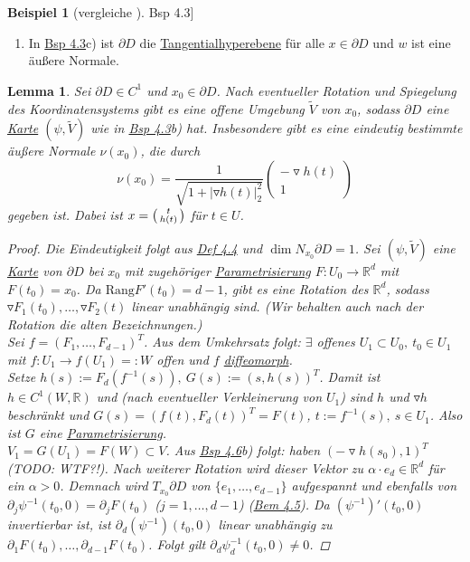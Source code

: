 \documentclass[a4paper]{report}
\newcommand{\R}{\mathbb{R}}
\newenvironment{jsmallmatrix}{\left( \begin{smallmatrix}}{\end{smallmatrix} \right)}
\newcommand{\jlabel}[1]{\label{j_#1}}
\newcommand{\jhyperref}[2]{\hyperref[j_#1]{#2}}
\newcommand{\jlink}[1]{\jhyperref{#1}{#1}}
\newcommand{\jabb}[3]{ #1: #2 \rightarrow #3 }
\theoremstyle{plain}
\newtheorem{lem}[thm]{Lemma}
\theoremstyle{definition}
\newtheorem{expl}[thm]{Beispiel}
\begin{document}
{{{{\begin{expl}[vergleiche \jlink{Bsp 4.3}]
\begin{enumerate}
        \item In \jlink{Bsp 4.3}c) ist $\partial D$ die \jlink{Tangentialhyperebene} für alle $x\in\partial D$ und $w$ ist eine äußere Normale.
    \end{enumerate}
\end{expl}

\begin{lem}
    \jlabel{Lem 4.7}
    Sei $\partial D \in C^1$ und $x_0\in \partial D$. Nach eventueller Rotation und Spiegelung des Koordinatensystems gibt es eine offene Umgebung $\tilde{V}$ von $x_0$, sodass $\partial D$ eine \jlink{Karte} $(\psi, \tilde{V})$ wie in \jlink{Bsp 4.3}b) hat. Insbesondere gibt es eine eindeutig bestimmte äußere Normale $\nu(x_0)$, die durch
    \[
        \nu(x_0) = \frac{1}{\sqrt{1 + |\triangledown h(t)|_2^2}} \begin{pmatrix}
                                                                     -\triangledown h(t) \\
                                                                     1
                                                                 \end{pmatrix}
    \]
    gegeben ist. Dabei ist $x = \begin{jsmallmatrix} t \\ h(t) \end{jsmallmatrix}$ für $t\in U$.
    \begin{proof}
        Die Eindeutigkeit folgt aus \jlink{Def 4.4} und $\dim N_{x_0} \partial D = 1$. Sei $(\psi, \tilde{V})$ eine \jlink{Karte} von $\partial D$ bei $x_0$ mit zugehöriger \jlink{Parametrisierung} $\jabb{F}{U_0}{\R^d}$ mit $F(t_0) = x_0$. Da $\text{Rang} F'(t_0) = d-1$, gibt es eine Rotation des $\R^d$, sodass $\triangledown F_1(t_0),\dots, \triangledown F_2(t)$ linear unabhängig sind. (Wir behalten auch nach der Rotation die alten Bezeichnungen.)\\
        Sei $f = (F_1,\dots, F_{d-1})^T$. Aus dem Umkehrsatz folgt: $\exists$ offenes $U_1\subset U_0,\ t_0 \in U_1$ mit $\jabb{f}{U_1}{f(U_1)} =: W$ offen und $f$ \jlink{diffeomorph}.\\
        Setze $h(s) := F_d(f^{-1}(s)), \ G(s) := (s, h(s))^T$. Damit ist $h\in C^1(W,\R)$ und (nach eventueller Verkleinerung von $U_1$) sind $h$ und $\triangledown h$ beschränkt und $G(s) = (f(t), F_d(t))^T = F(t)$, $t := f^{-1}(s), \ s\in U_1$. Also ist $G$ eine \jlink{Parametrisierung}.\\
        $V_1 = G(U_1) = F(W) \subset V$. Aus \jlink{Bsp 4.6}b) folgt: haben $(-\triangledown h(s_0), 1)^T$ (TODO: WTF?!). Nach weiterer Rotation wird dieser Vektor zu $\alpha\cdot e_d \in \R^d$ für ein $\alpha >0$. Demnach wird $T_{x_0} \partial D$ von $\{e_1,\dots,e_{d-1}\}$ aufgespannt und ebenfalls von $\partial_j \psi^{-1}(t_0,0) = \partial_j F(t_0)$ ($j=1,\dots, d-1$) (\jlink{Bem 4.5}). Da $(\psi^{-1})'(t_0,0)$ invertierbar ist, ist $\partial_d(\psi^{-1})(t_0,0)$ linear unabhängig zu $\partial_1 F(t_0),\dots,\partial_{d-1}F(t_0)$. Folgt gilt $\partial_d \psi^{-1}_d(t_0,0) \ne 0$.
        

\end{proof}
\end{lem}}}}}
\end{document}
